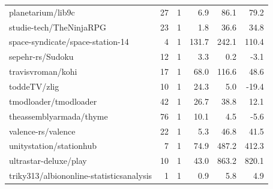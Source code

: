 \begin{center}
{\begin{longtable}{@{}lrrrrr@{}}
planetarium/lib9c & 27 & 1 & 6.9 & 86.1 & 79.2 \\
studie-tech/TheNinjaRPG & 23 & 1 & 1.8 & 36.6 & 34.8 \\
space-syndicate/space-station-14 & 4 & 1 & 131.7 & 242.1 & 110.4 \\
sepehr-rs/Sudoku & 12 & 1 & 3.3 & 0.2 & -3.1 \\
travisvroman/kohi & 17 & 1 & 68.0 & 116.6 & 48.6 \\
toddeTV/zlig & 10 & 1 & 24.3 & 5.0 & -19.4 \\
tmodloader/tmodloader & 42 & 1 & 26.7 & 38.8 & 12.1 \\
theassemblyarmada/thyme & 76 & 1 & 10.1 & 4.5 & -5.6 \\
valence-rs/valence & 22 & 1 & 5.3 & 46.8 & 41.5 \\
unitystation/stationhub & 7 & 1 & 74.9 & 487.2 & 412.3 \\
ultrastar-deluxe/play & 10 & 1 & 43.0 & 863.2 & 820.1 \\
triky313/albiononline-statisticsanalysis & 1 & 1 & 0.9 & 5.8 & 4.9 \\
\bottomrule
\end{longtable}
}
\end{center}
